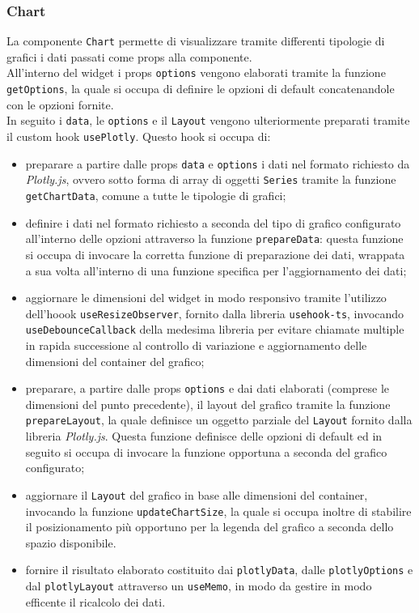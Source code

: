 \subsubsection{Chart}
La componente \texttt{Chart} permette di visualizzare tramite differenti tipologie di grafici i dati passati come props alla componente. \\
All'interno del widget i props \texttt{options} vengono elaborati tramite la funzione \texttt{getOptions}, la quale si occupa di definire le opzioni di
default concatenandole con le opzioni fornite. \\
In seguito i \texttt{data}, le \texttt{options} e il \texttt{Layout} vengono ulteriormente preparati tramite il custom hook \texttt{usePlotly}. Questo hook si
occupa di:
\begin{itemize}
    \item preparare a partire dalle props \texttt{data} e \texttt{options} i dati nel formato richiesto da \textit{Plotly.js}, ovvero sotto forma di array di oggetti
          \texttt{Series} tramite la funzione \texttt{getChartData}, comune a tutte le tipologie di grafici;
    \item definire i dati nel formato richiesto a seconda del tipo di grafico configurato all'interno delle opzioni attraverso la funzione \texttt{prepareData}:
          questa funzione si occupa di invocare la corretta funzione di preparazione dei dati, wrappata a sua volta all'interno di una funzione specifica per l'aggiornamento
          dei dati;
    \item aggiornare le dimensioni del widget in modo responsivo tramite l'utilizzo dell'hoook \texttt{useResizeObserver}, fornito dalla libreria \texttt{usehook-ts},
          invocando \texttt{useDebounceCallback} della medesima libreria per evitare chiamate multiple in rapida successione al controllo di variazione e aggiornamento
          delle dimensioni del container del grafico;
    \item preparare, a partire dalle props \texttt{options} e dai dati elaborati (comprese le dimensioni del punto precedente), il layout del grafico tramite la funzione
          \texttt{prepareLayout}, la quale definisce un oggetto parziale del \texttt{Layout} fornito dalla libreria \textit{Plotly.js}. Questa funzione definisce delle opzioni
          di default ed in seguito si occupa di invocare la funzione opportuna a seconda del grafico configurato;
    \item aggiornare il \texttt{Layout} del grafico in base alle dimensioni del container, invocando la funzione \texttt{updateChartSize}, la quale si occupa inoltre di stabilire
          il posizionamento più opportuno per la legenda del grafico a seconda dello spazio disponibile.
    \item fornire il risultato elaborato costituito dai \texttt{plotlyData}, dalle \texttt{plotlyOptions} e dal \texttt{plotlyLayout} attraverso un \texttt{useMemo}, in modo da
          gestire in modo efficente il ricalcolo dei dati.
\end{itemize}

